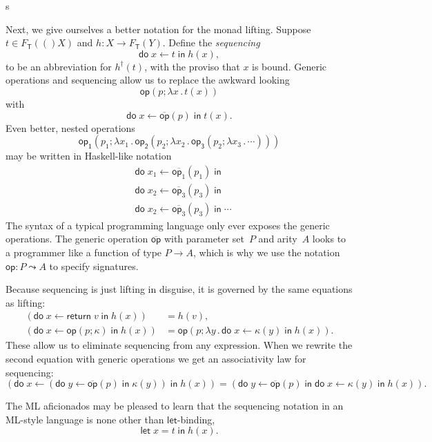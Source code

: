 s\documentclass{amsart}
\newcommand{\theory}[1]{\mathsf{#1}} %
\newcommand{\Free}[2]{F_{\theory{#1}}(#2)} %
\newcommand{\lam}[1]{\lambda #1 \,.\,}
\newcommand{\opdecl}[3]{#1 : #2 \leadsto #3} %
\newcommand{\lift}[1]{#1^\dagger} %
\newcommand{\kode}[1]{\mathsf{#1}}
\newcommand{\seq}[2]{\kode{do}\; #1 \leftarrow #2 \;\kode{in}\;}
\newcommand{\xopgen}[2]{\overline{#1}(#2)}
\newcommand{\opgen}[2]{\xopgen{\kode{#1}}{#2}}
\newcommand{\opcall}[3]{\kode{#1}(#2; #3)}
\newcommand{\return}[1]{\kode{return}\;#1}
\begin{document}
Next, we give ourselves a better notation for the monad lifting. Suppose
$t \in \Free{T}(X)$ and $h : X \to \Free{T}{Y}$. Define the \emph{sequencing}
%
\begin{equation*}
  \seq{x}{t} h(x),
\end{equation*}
%
to be an abbreviation for $\lift{h}(t)$, with the proviso that $x$ is bound.
Generic operations and sequencing allow us to replace the awkward looking
%
\begin{equation*}
  \opcall{op}{p}{\lam{x} t(x)}
\end{equation*}
%
with
%
\begin{equation*}
  \seq{x}{\opgen{op}{p}} t(x).
\end{equation*}
%
Even better, nested operations
%
\begin{equation*}
  \opcall{op_1}{p_1}{\lam{x_1}
  \opcall{op_2}{p_2}{\lam{x_2}
  \opcall{op_3}{p_2}{\lam{x_3}
  \cdots
  }}}
\end{equation*}
%
may be written in Haskell-like notation
%
\begin{align*}
  &\seq{x_1}{\xopgen{\kode{op}_1}{p_1}} \\
  &\seq{x_2}{\xopgen{\kode{op}_3}{p_3}} \\
  &\seq{x_2}{\xopgen{\kode{op}_3}{p_3}}
  \cdots
\end{align*}
%
The syntax of a typical programming language only ever exposes the generic
operations. The generic operation $\overline{\kode{op}}$ with parameter set~$P$
and arity~$A$ looks to a programmer like a function of type $P \to A$, which is
why we use the notation $\opdecl{\kode{op}}{P}{A}$ to specify signatures.

Because sequencing is just lifting in disguise, it is governed by the same
equations as lifting:
%
\begin{align*}
  (\seq{x}{\return{v}} h(x)) &= h(v), \\
  (\seq{x}{\opcall{op}{p}{\kappa}} h(x)) &=
  \opcall{op}{p}{\lam{y} \seq{x}{\kappa(y)} h(x)}.
\end{align*}
%
These allow us to eliminate sequencing from any expression. When we rewrite the
second equation with generic operations we get an associativity law for
sequencing:
%
\begin{equation*}
  (\seq{x}{(\seq{y}{\opgen{op}{p}} \kappa(y))} h(x)) =
  (\seq{y}{\opgen{op}{p}} \seq{x}{\kappa(y)} h(x)).
\end{equation*}

The ML aficionados may be pleased to learn that the sequencing notation in
an ML-style language is none other than $\kode{let}$-binding,
%
\begin{equation*}
  \kode{let}\; x = t\;\kode{in}\;h(x).
\end{equation*}
\end{document}

